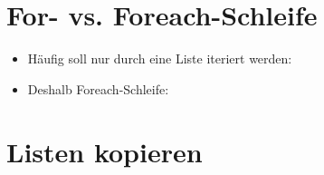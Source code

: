 \section{For- vs. Foreach-Schleife}
\begin{frame}
    \slidehead

    \begin{itemize}
        \item Häufig soll nur durch eine Liste iteriert werden:
            \pause

        \item Deshalb Foreach-Schleife:
    \end{itemize}
\end{frame}

\livecoding



\subtitle{Kapitel 5: ganz viele variablen in einer}


\section{Listen kopieren}
\begin{frame}
    \slidehead
\end{frame}


